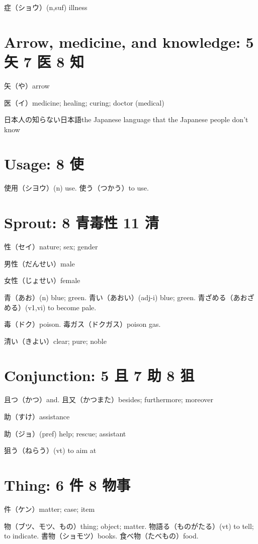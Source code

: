症（ショウ）(n,suf) illness

\section{Arrow, medicine, and knowledge: 5 矢 7 医 8 知}

矢（や）arrow

医（イ）medicine; healing; curing; doctor (medical)

日本人の知らない日本語the Japanese language that the Japanese people don't know

\section{Usage: 8 使}

使用（シヨウ）(n) use.
使う（つかう）to use.

\section{Sprout: 8 青毒性 11 清}

性（セイ）nature; sex; gender

男性（だんせい）male

女性（じょせい）female

青（あお）(n) blue; green.
青い（あおい）(adj-i) blue; green.
青ざめる（あおざめる）(v1,vi) to become pale.

毒（ドク）poison.
毒ガス（ドクガス）poison gas.

清い（きよい）clear; pure; noble

\section{Conjunction: 5 且 7 助 8 狙}

且つ（かつ）and.
且又（かつまた）besides; furthermore; moreover

助（すけ）assistance

助（ジョ）(pref) help; rescue; assistant

狙う（ねらう）(vt) to aim at

\section{Thing: 6 件 8 物事}

件（ケン）matter; case; item

物（ブツ、モツ、もの）thing; object; matter.
物語る（ものがたる）(vt) to tell; to indicate.
書物（ショモツ）books.
食べ物（たべもの）food.

